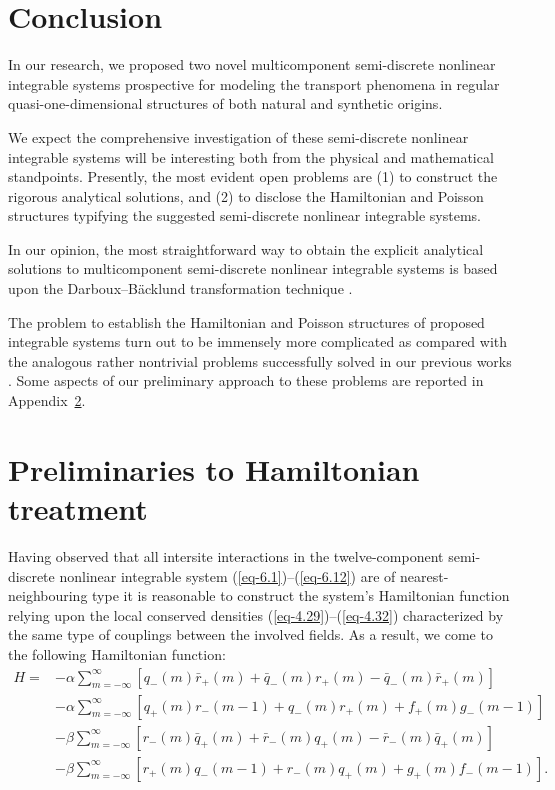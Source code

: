 \documentclass[10pt,a4paper]{amsart}
\numberwithin{equation}{section}
\begin{document}
\section{Conclusion}

In our research, we proposed two novel multicomponent semi-discrete nonlinear integrable systems prospective for modeling the transport phenomena in regular quasi-one-dimensional structures of both natural and synthetic origins.

We expect the comprehensive investigation of these semi-discrete nonlinear integrable systems will be interesting both from the physical and mathematical standpoints.
Presently, the most evident open problems are (1) to construct the rigorous analytical solutions, and (2) to disclose the Hamiltonian and Poisson structures typifying the suggested semi-discrete nonlinear integrable systems.

In our opinion, the most straightforward way to obtain the explicit analytical solutions to multicomponent semi-discrete nonlinear integrable systems is based upon the Darboux--B\"{a}cklund transformation technique \cite{vakhnenko-JMP-56-033505,vakhnenko-JNMP-24-250, vakhnenko-JMP-59-053504,vakhnenko-PRE-108-024223, vakhnenko-PRSA-477-20210562, vakhnenko-EPJP-137-1176}.

The problem to establish the Hamiltonian and Poisson structures of proposed integrable systems turn out to be immensely more complicated as compared with the analogous rather nontrivial problems successfully solved in our previous works \cite{vakhnenko-JMP-56-033505, vakhnenko-JMP-57-113504,vakhnenko-JNMP-24-250, vakhnenko-JMP-59-053504, vakhnenko-LMP-108-1807}.
Some aspects of our preliminary approach to these problems are reported in Appendix~\ref{app}.

\appendix

\section{Preliminaries to Hamiltonian treatment}\label{app}

Having observed that all intersite interactions in the twelve-component semi-discrete nonlinear integrable system (\ref{eq-6.1})--(\ref{eq-6.12}) are of nearest-neighbouring
type it is reasonable to construct the system's Hamiltonian function relying upon the local conserved densities (\ref{eq-4.29})--(\ref{eq-4.32}) characterized by the same type
of couplings between the involved fields. As a result, we come to the following Hamiltonian function:
\begin{align}
 H ={}& - \alpha \sum_{m=-\infty}^\infty [q_{-}(m)\bar{r}_{+}(m)+\bar{q}_{-}(m)r_{+}(m)-\bar{q}_{-}(m)\bar{r}_{+}(m)]\nonumber\\
 & - \alpha \sum_{m=-\infty}^\infty [q_{+}(m)r_{-}(m-1)+q_{-}(m)r_{+}(m)+f_{+}(m)g_{-}(m-1)]\nonumber\\
 & - \beta \sum_{m=-\infty}^\infty [r_{-}(m)\bar{q}_{+}(m)+\bar{r}_{-}(m)q_{+}(m)-\bar{r}_{-}(m)\bar{q}_{+}(m)]\nonumber\\
 & - \beta \sum_{m=-\infty}^\infty [r_{+}(m)q_{-}(m-1)+r_{-}(m)q_{+}(m)+g_{+}(m)f_{-}(m-1)] .\label{eq-A.1}
\end{align}
\end{document}
